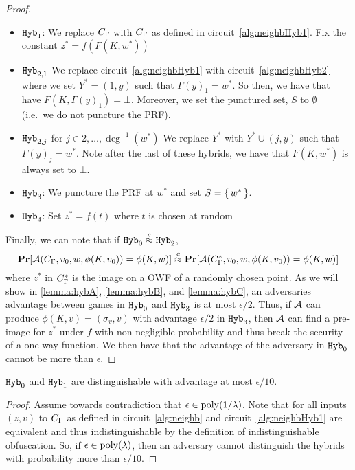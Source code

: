 \begin{lemma}
\begin{proof}
\begin{itemize}
			\item $\texttt{Hyb}_1$: We replace $C_\Gamma$ with $C_\Gamma$ as defined in circuit~\ref{alg:neighbHyb1}.
			Fix the constant $z^* = f(F(K, w^*))$
			\item $\texttt{Hyb}_{2, 1}$
			We replace circuit~\ref{alg:neighbHyb1} with circuit~\ref{alg:neighbHyb2} where we 
			set $Y^* = (1, y)$ such that $\Gamma(y)_1 = w^*$. So then, we have that
			have $F(K, \Gamma(y)_1) = \bot$. Moreover, we set the punctured set, $S$ to $\emptyset$ (i.e.\ we do not puncture the PRF).
			\item $\texttt{Hyb}_{2, j}$ for $j \in 2, \dots, \deg^{-1}(w^*)$
			We replace $Y^*$ with $Y^* \cup (j, y)$ such that $\Gamma(y)_j = w^*$.
			Note after the last of these hybrids, we have that $F(K, w^*)$ is always set to $\bot$.
			\item $\texttt{Hyb}_3$: We puncture the PRF at $w^*$ and set $S = \set{w^*}$.
			\item $\texttt{Hyb}_4$: Set $z^* = f(t)$ where $t$ is chosen at random %
		\end{itemize}
		Finally, we can note that if $\texttt{Hyb}_0 \overset{c}{\approx} \texttt{Hyb}_2$,
		\begin{equation*}
			\operatorname*{\mathbf{Pr}}[\mathcal{A}(C_\Gamma, v_0, w, \phi(K, v_0)) = \phi(K, w)] 
			\overset{c}{\approx}
			\operatorname*{\mathbf{Pr}}[\mathcal{A}(C_\Gamma^*, v_0, w, \phi(K, v_0)) = \phi(K, w)]
		\end{equation*}
		where $z^*$ in $C_\Gamma^*$	is the image on a OWF of a randomly chosen point.
		As we will show in \cref{lemma:hybA}, \cref{lemma:hybB}, and \cref{lemma:hybC},
		an adversaries advantage between games in $\texttt{Hyb}_0$ and $\texttt{Hyb}_3$ is at most $\epsilon / 2$.
		Thus, if $\mathcal{A}$ can produce $\phi(K, v) = (\sigma_v, v)$ with advantage $\epsilon / 2$
		in $\texttt{Hyb}_3$, then $\mathcal{A}$
		can find a pre-image for $z^*$ under $f$ with non-negligible probability and thus break the security of a one way function.
		We then have that the advantage of the adversary in $\texttt{Hyb}_0$ cannot be more than $\epsilon$.
	\end{proof}
\end{lemma}

\begin{lemma}
	\label{lemma:hybA}
	$\texttt{Hyb}_0$ and $\texttt{Hyb}_1$ are distinguishable with advantage at most $\epsilon / 10$.
	\begin{proof}
		Assume towards contradiction that $\epsilon \in \operatorname{poly}(1/\lambda)$.
		Note that for all inputs $(z, v)$ to $C_\Gamma$ as defined in circuit~\ref{alg:neighb} and circuit~\ref{alg:neighbHyb1}
		are equivalent and thus indistinguishable by the definition of indistinguishable obfuscation.
		So, if $\epsilon \in \operatorname{poly}(\lambda)$, then an adversary cannot distinguish the hybrids with probability more than $\epsilon / 10$.
	\end{proof}
\end{lemma}


